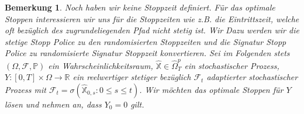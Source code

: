 \documentclass[12pt,titlepage,headsepline]{article}
\newtheorem*{bemerkung*}{Bemerkung}
\begin{document}
      \begin{bemerkung*}
        \textup{
        Noch haben wir keine Stoppzeit definiert. Für das optimale Stoppen interessieren wir uns für die Stoppzeiten wie z.B. die Eintrittszeit, welche oft bezüglich des zugrundeliegenden Pfad nicht stetig ist. Wir  Dazu werden wir die stetige Stopp Police zu den randomisierten Stoppzeiten und die Signatur Stopp Police zu randomisierte Signatur Stoppzeit konvertieren.
        \hfill\break
        Sei im Folgenden stets $(\Omega, \mathcal{F},\mathbb{P})$ ein Wahrscheinlichkeitsraum, $\hat{\mathbb{X}} \in \hat{\Omega}_T^p$ ein stochastischer Prozess, $Y: [0,T] \times \Omega \rightarrow \mathbb{R}$ ein reelwertiger stetiger bezüglich $\mathcal{F}_t$ adaptierter stochastischer Prozess mit
        $\mathcal{F}_t = \sigma(\hat{\mathbb{X}}_{0,s} : 0 \leq s \leq t)$. Wir möchten das optimale Stoppen für $Y$ lösen und nehmen an, dass $Y_0 = 0$ gilt.
        }
      \end{bemerkung*}
\end{document}
